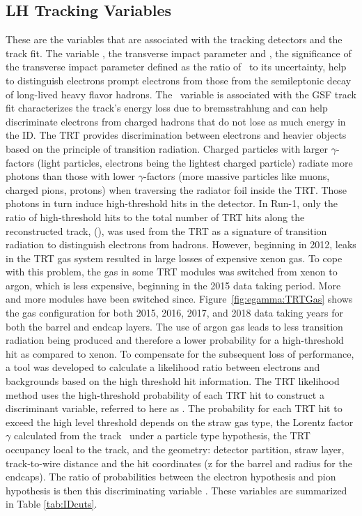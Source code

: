 \subsection{LH Tracking Variables}
\label{sec:egamma:trackvars}
These are the variables that are associated with the tracking detectors and the track fit.
The variable \trackdO, the transverse impact parameter and \dOSignificance, the significance of the transverse impact parameter defined as the ratio of \trackdO\ to its uncertainty, help to distinguish electrons prompt electrons from those from the semileptonic decay of long-lived heavy flavor hadrons.
The \deltapoverp\ variable is associated with the GSF track fit characterizes the track's energy loss due to bremsstrahlung and can help discriminate electrons from charged hadrons that do not lose as much energy in the ID.
The TRT provides discrimination between electrons and heavier objects based on the principle of transition radiation.
Charged particles with larger $\gamma$-factors (light particles, electrons being the lightest charged particle) radiate more photons than those with lower $\gamma$-factors (more massive particles like muons, charged pions, protons) when traversing the radiator foil inside the TRT.
Those photons in turn induce high-threshold hits in the detector.
In Run-1, only the ratio of high-threshold hits to the total number of TRT hits along the reconstructed track, (\TR), was used from the TRT as a signature of transition radiation to distinguish electrons from hadrons.
However, beginning in 2012, leaks in the TRT gas system resulted in large losses of expensive xenon gas.
To cope with this problem, the gas in some TRT modules was switched from xenon to argon, which is less expensive, beginning in the 2015 data taking period. 
More and more modules have been switched since.
Figure~\ref{fig:egamma:TRTGas} shows the gas configuration for both 2015, 2016, 2017, and 2018 data taking years for both the barrel and endcap layers.
The use of argon gas leads to less transition radiation being produced and therefore a lower probability for a high-threshold hit as compared to xenon.
To compensate for the subsequent loss of performance, a tool was developed to calculate a likelihood ratio between electrons and backgrounds based on the high threshold hit information.
The TRT likelihood method uses the high-threshold probability of each TRT hit to construct a discriminant variable, referred to here as \TRTPID.
The probability for each TRT hit to exceed the high level threshold depends on the straw gas type, the Lorentz factor $\gamma$ calculated from the track \pt\ under a particle type hypothesis, the TRT occupancy local to the track, and the geometry: detector partition, straw layer, track-to-wire distance and the hit coordinates (z for the barrel and radius for the endcaps).
The ratio of probabilities between the electron hypothesis and pion hypothesis is then this discriminating variable \TRTPID.
These variables are summarized in Table \ref{tab:IDcuts}.


